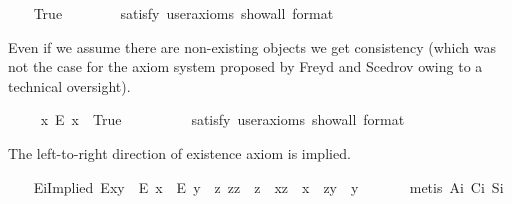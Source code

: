 \begin{isabellebody}
\ \ \isamarkupfalse%
\ True\ \ %
\isanewline
\ \ \ \ \isamarkupfalse%
\ {\isacharbrackleft}satisfy{\isacharcomma}\ user{\isacharunderscore}axioms{\isacharcomma}\ show{\isacharunderscore}all{\isacharcomma}\ format\ {\isacharequal}\ {}{\isacharbrackright}%
\isadelimproof
\ %
\endisadelimproof
%
\isatagproof
{}\isamarkupfalse%
%
\endisatagproof
{\isafoldproof}%
%
\isadelimproof
%
\endisadelimproof
%
\begin{isamarkuptext}%
Even if we assume there are non-existing objects we get consistency (which was not the case for
  the axiom system proposed by Freyd and Scedrov owing to a technical oversight).%
\end{isamarkuptext}\isamarkuptrue%
\ \ \isamarkupfalse%
\ \ {\isachardoublequoteopen}{\isasymexists}x{\isachardot}\ \isactrlbold {\isasymnot}{\isacharparenleft}E\ x{\isacharparenright}{\isachardoublequoteclose}\ \ True\ \ %
\ \isanewline
\ \ \ \ \isamarkupfalse%
\ {\isacharbrackleft}satisfy{\isacharcomma}\ user{\isacharunderscore}axioms{\isacharcomma}\ show{\isacharunderscore}all{\isacharcomma}\ format\ {\isacharequal}\ {}{\isacharbrackright}%
\isadelimproof
\ %
\endisadelimproof
%
\isatagproof
{}\isamarkupfalse%
%
\endisatagproof
{\isafoldproof}%
%
\isadelimproof
%
\endisadelimproof
%
\begin{isamarkuptext}%
The left-to-right direction of existence axiom  is implied.%
\end{isamarkuptext}\isamarkuptrue%
\ \ \isamarkupfalse%
\ E\isactrlsub iImplied{\isacharcolon}\ {\isachardoublequoteopen}E{\isacharparenleft}x{\isasymcdot}y{\isacharparenright}\ \isactrlbold {\isasymrightarrow}\ {\isacharparenleft}E\ x\ \isactrlbold {\isasymand}\ E\ y\ \isactrlbold {\isasymand}\ {\isacharparenleft}\isactrlbold {\isasymexists}z{\isachardot}\ z{\isasymcdot}z\ {\isasymcong}\ z\ \isactrlbold {\isasymand}\ x{\isasymcdot}z\ {\isasymcong}\ x\ \isactrlbold {\isasymand}\ z{\isasymcdot}y\ {\isasymcong}\ y{\isacharparenright}{\isacharparenright}{\isachardoublequoteclose}\ \isanewline
%
\isadelimproof
\ \ \ \ %
\endisadelimproof
%
\isatagproof
{}\isamarkupfalse%
\ {\isacharparenleft}metis\ A\isactrlsub i\ C\isactrlsub i\ S\isactrlsub i{\isacharparenright}%

\end{isabellebody}
